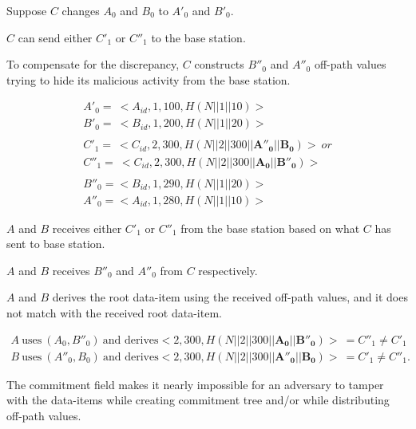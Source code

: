 \documentclass[%
  slidesonly,%
  semlayer%
  ]{seminar}                                  %
\begin{document}
\begin{slide}
        Suppose $C$ changes $A_{0}$ and $B_{0}$ to $A'_{0}$ and $B'_{0}$.

        $C$ can send either $C'_{1}$ or $C''_{1}$ to the base station.
        
        To compensate for the discrepancy, $C$ constructs $B''_{0}$ and $A''_{0}$ off-path values trying to hide its malicious activity from the base station.

        \begin{equation*}
          \begin{array}{l}
            A'_{0} =\ <A_{id},1,100, H(N||1||10)>\\
            B'_{0} =\ <B_{id},1,200, H(N||1||20)>\\
            \\
            C'_{1} =\ <C_{id},2,300, H(N||2||300||\mathbf{A''_{0}}||\mathbf{B_{0}})>\ or \\ 
            C''_{1} =\ <C_{id},2,300, H(N||2||300||\mathbf{A_{0}}||\mathbf{B''_{0}})>\\
            \\
            B''_{0} = <B_{id},1,290,H(N||1||20)>\\
            A''_{0} = <A_{id},1,280,H(N||1||10)>
          \end{array}
        \end{equation*}
        \vfill
        \clearpage

        $A$ and $B$ receives either $C'_{1}$ or $C''_{1}$ from the base station based on what $C$ has sent to base station.

        $A$ and $B$ receives $B''_{0}$ and $A''_{0}$ from $C$ respectively.

        $A$ and $B$ derives the root data-item using the received off-path values, and it does not match with the received root data-item.

        \begin{equation*}
          \begin{array}{l}
            A\ \mbox{uses}\ (A_{0}, B''_{0})\ \mbox{and derives} <2,300,H(N||2||300||\mathbf{A_{0}}||\mathbf{B''_{0}})>\  = C''_{1} \neq C'_{1} \\
            B\ \mbox{uses}\ (A''_{0}, B_{0})\ \mbox{and derives} <2,300,H(N||2||300||\mathbf{A''_{0}}||\mathbf{B_{0}})>\  = C'_{1} \neq C''_{1}.
          \end{array}
        \end{equation*}

        The commitment field makes it nearly impossible for an adversary to tamper with the data-items while creating commitment tree and/or while distributing off-path values.
        \vfill
        \clearpage


\end{slide}
\end{document}
